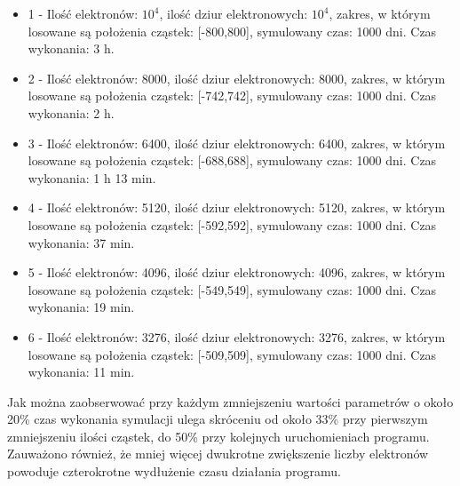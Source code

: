 \begin{itemize}
\item 1 - Ilość elektronów: $10^{4}$, ilość dziur elektronowych: $10^{4}$, zakres, w którym losowane są położenia cząstek: [-800,800], symulowany czas: 1000 dni. Czas wykonania: 3 h.
\item 2 - Ilość elektronów: 8000, ilość dziur elektronowych: 8000, zakres, w którym losowane są położenia cząstek: [-742,742], symulowany czas: 1000 dni. Czas wykonania: 2 h.
\item 3 - Ilość elektronów: 6400, ilość dziur elektronowych: 6400, zakres, w którym losowane są położenia cząstek: [-688,688], symulowany czas: 1000 dni. Czas wykonania: 1 h 13 min.
\item 4 - Ilość elektronów: 5120, ilość dziur elektronowych: 5120, zakres, w którym losowane są położenia cząstek: [-592,592], symulowany czas: 1000 dni. Czas wykonania: 37 min.
\item 5 - Ilość elektronów: 4096, ilość dziur elektronowych: 4096, zakres, w którym losowane są położenia cząstek: [-549,549], symulowany czas: 1000 dni. Czas wykonania: 19 min.
\item 6 - Ilość elektronów: 3276, ilość dziur elektronowych: 3276, zakres, w którym losowane są położenia cząstek: [-509,509], symulowany czas: 1000 dni. Czas wykonania: 11 min.

\end{itemize}

Jak można zaobserwować przy każdym zmniejszeniu wartości parametrów o około 20\% czas wykonania symulacji ulega skróceniu od około 33\% przy pierwszym zmniejszeniu ilości cząstek, do 50\% przy kolejnych uruchomieniach programu. Zauważono również, że mniej więcej dwukrotne zwiększenie liczby elektronów powoduje czterokrotne wydłużenie czasu działania programu.
